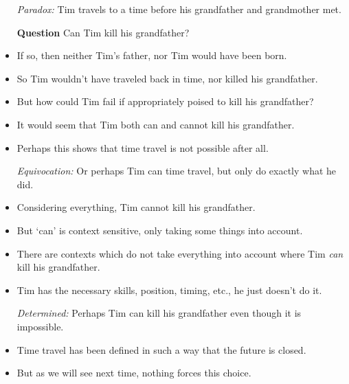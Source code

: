 \documentclass[a4paper, 11pt]{article} %
\begin{document}
\begin{itemize}
  \item[\it Paradox:] Tim travels to a time before his grandfather and grandmother met.
  \item[\bf Question] Can Tim kill his grandfather?
    \item If so, then neither Tim's father, nor Tim would have been born.
    \item So Tim wouldn't have traveled back in time, nor killed his grandfather.
    \item But how could Tim fail if appropriately poised to kill his grandfather?
    \item It would seem that Tim both can and cannot kill his grandfather.
    \item Perhaps this shows that time travel is not possible after all. 
  \item[\it Equivocation:] Or perhaps Tim can time travel, but only do exactly what he did.
    \item Considering everything, Tim cannot kill his grandfather.
    \item But `can' is context sensitive, only taking some things into account.
    \item There are contexts which do not take everything into account where Tim \textit{can} kill his grandfather.
    \item Tim has the necessary skills, position, timing, etc., he just doesn't do it.
  \item[\it Determined:] Perhaps Tim can kill his grandfather even though it is impossible.
    \item Time travel has been defined in such a way that the future is closed.
    \item But as we will see next time, nothing forces this choice.
\end{itemize}
\end{document}
